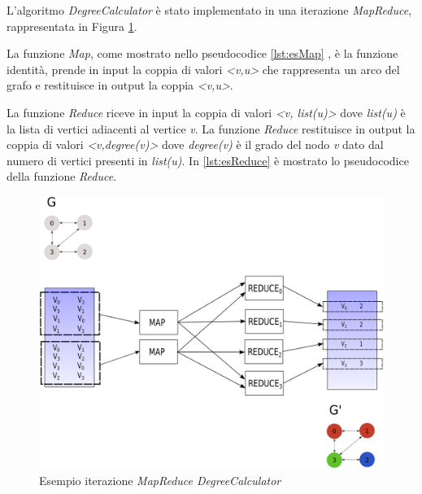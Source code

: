 \documentclass[LaM,binding=0.6cm]{sapthesis}
\begin{document}
L'algoritmo \textit{DegreeCalculator} è stato implementato in una iterazione \textit{MapReduce}, rappresentata in Figura \ref{fig:MRDEGREE}.

La funzione \textit{Map}, come mostrato nello pseudocodice \ref{lst:esMap} , è la funzione identità, prende in input la coppia di valori \textit{<v,u>} che rappresenta un arco del grafo e restituisce in output la coppia \textit{<v,u>}.

La funzione \textit{Reduce} riceve in input la coppia di valori \textit{<v, list(u)>} dove \textit{list(u)} è la lista  di vertici adiacenti al vertice \textit{v}. La funzione \textit{Reduce} restituisce in output la coppia di valori \textit{<v,degree(v)>} dove \textit{degree(v)} è il grado del nodo \textit{v} dato dal numero di vertici presenti in \textit{list(u)}. In \ref{lst:esReduce} è mostrato lo pseudocodice della funzione \textit{Reduce}.

\begin{minipage}{\linewidth}

\end{minipage}
\begin{minipage}{\linewidth}

\end{minipage}

\begin{figure}
\centering
\includegraphics[width=1\textwidth]{MR-DegreeCalculator}
\caption{Esempio iterazione \textit{MapReduce DegreeCalculator}}
\label{fig:MRDEGREE}
\end{figure}
\end{document}

